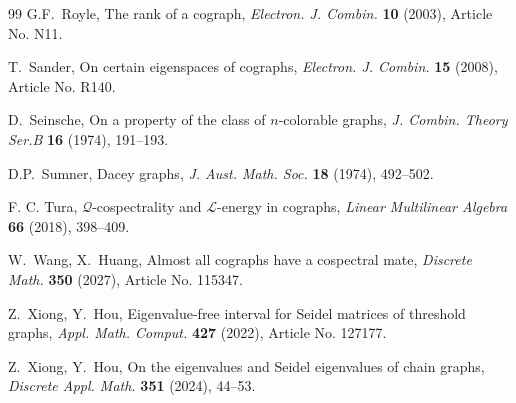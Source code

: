 \documentclass[11pt]{article}
\theoremstyle{plain}
\theoremstyle{definition}
\theoremstyle{remark}
\begin{document}
\begin{thebibliography}{99}
		 G.F.~Royle, The rank of a cograph, \emph{Electron. J. Combin.} \textbf{10} (2003), Article No. N11.
		
		 T.~Sander, On certain eigenspaces of cographs, \emph{Electron. J. Combin.} \textbf{15} (2008), Article No. R140.
		
		 D.~Seinsche, On a property of the class of $n$-colorable graphs, \emph{J. Combin. Theory Ser.B} \textbf{16} (1974), 191--193.
		
		 D.P.~Sumner, Dacey graphs, \emph{J. Aust. Math. Soc.} \textbf{18} (1974), 492--502.
		
		F. C. Tura, $\mathcal{Q}$-cospectrality and  $\mathcal{L}$-energy in cographs, \emph{Linear Multilinear Algebra} \textbf{66} (2018), 398--409.
		
		 W.~Wang, X.~Huang, Almost all cographs have a cospectral mate, \emph{Discrete Math.} \textbf{350} (2027), Article No. 115347.
		
		 Z.~Xiong, Y.~Hou, Eigenvalue-free interval for Seidel matrices of threshold graphs, \emph{Appl. Math. Comput.} \textbf{427} (2022), Article No. 127177.
		
		 Z.~Xiong, Y.~Hou, On the eigenvalues and Seidel eigenvalues of chain graphs, \emph{Discrete Appl. Math.} \textbf{351} (2024), 44--53.
		
	\end{thebibliography}
	
\end{document}
